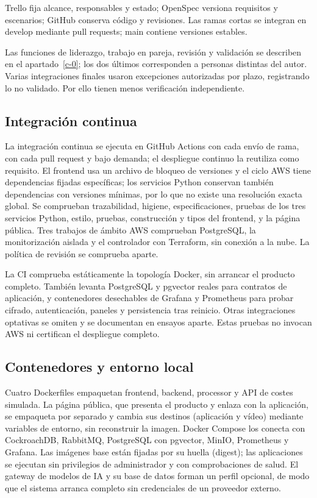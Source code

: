 Trello fija alcance, responsables y estado; OpenSpec versiona requisitos y escenarios; GitHub conserva código y revisiones. Las ramas cortas se integran en develop mediante pull requests; main contiene versiones estables. \cite{gobierno}

Las funciones de liderazgo, trabajo en pareja, revisión y validación se describen en el apartado~\ref{c-0}; los dos últimos corresponden a personas distintas del autor. Varias integraciones finales usaron excepciones autorizadas por plazo, registrando lo no validado. Por ello tienen menos verificación independiente.

\subsection{Integración continua}\label{f-2}

La integración continua se ejecuta en GitHub Actions con cada envío de rama, con cada pull request y bajo demanda; el despliegue continuo la reutiliza como requisito. El frontend usa un archivo de bloqueo de versiones y el ciclo AWS tiene dependencias fijadas específicas; los servicios Python conservan también dependencias con versiones mínimas, por lo que no existe una resolución exacta global. Se comprueban trazabilidad, higiene, especificaciones, pruebas de los tres servicios Python, estilo, pruebas, construcción y tipos del frontend, y la página pública. Tres trabajos de ámbito AWS comprueban PostgreSQL, la monitorización aislada y el controlador con Terraform, sin conexión a la nube. La política de revisión se comprueba aparte. \cite{ci-integracion}

La CI comprueba estáticamente la topología Docker, sin arrancar el producto completo. También levanta PostgreSQL y pgvector reales para contratos de aplicación, y contenedores desechables de Grafana y Prometheus para probar cifrado, autenticación, paneles y persistencia tras reinicio. Otras integraciones optativas se omiten y se documentan en ensayos aparte. Estas pruebas no invocan AWS ni certifican el despliegue completo. \cite{ci-integracion}

\subsection{Contenedores y entorno local}\label{f-3}

Cuatro Dockerfiles empaquetan frontend, backend, processor y API de costes simulada. La página pública, que presenta el producto y enlaza con la aplicación, se empaqueta por separado y cambia sus destinos (aplicación y vídeo) mediante variables de entorno, sin reconstruir la imagen. Docker Compose los conecta con CockroachDB, RabbitMQ, PostgreSQL con pgvector, MinIO, Prometheus y Grafana. Las imágenes base están fijadas por su huella (digest); las aplicaciones se ejecutan sin privilegios de administrador y con comprobaciones de salud. El gateway de modelos de IA y su base de datos forman un perfil opcional, de modo que el sistema arranca completo sin credenciales de un proveedor externo. \cite{despliegue}


